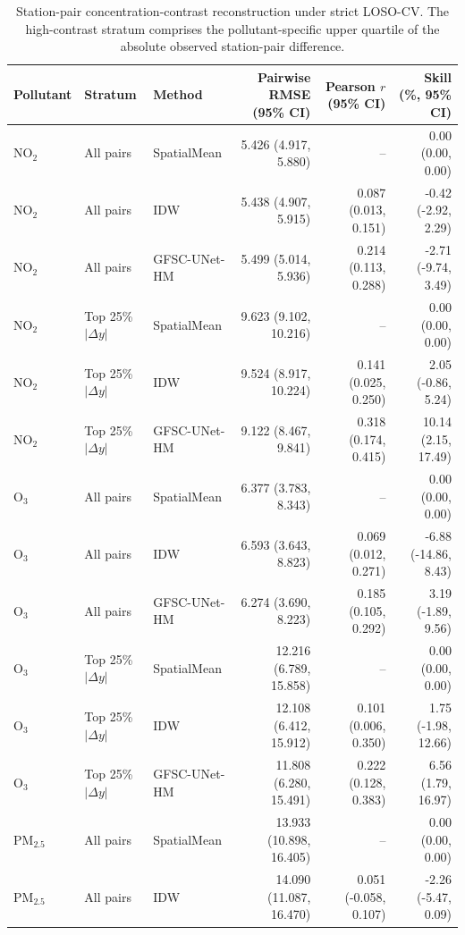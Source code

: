 \begin{table}[t]
\centering
\caption{Station-pair concentration-contrast reconstruction under strict LOSO-CV. The high-contrast stratum comprises the pollutant-specific upper quartile of the absolute observed station-pair difference.}
\label{tab:pairwise_contrast}
\scriptsize
\setlength{\tabcolsep}{3.5pt}
\begin{tabular}{lllrrr}
\toprule
Pollutant & Stratum & Method & Pairwise RMSE (95\% CI) & Pearson $r$ (95\% CI) & Skill (\%, 95\% CI) \\
\midrule
$\mathrm{NO}_2$ & All pairs & SpatialMean & 5.426 (4.917, 5.880) & -- & 0.00 (0.00, 0.00) \\
$\mathrm{NO}_2$ & All pairs & IDW & 5.438 (4.907, 5.915) & 0.087 (0.013, 0.151) & -0.42 (-2.92, 2.29) \\
$\mathrm{NO}_2$ & All pairs & GFSC-UNet-HM & 5.499 (5.014, 5.936) & 0.214 (0.113, 0.288) & -2.71 (-9.74, 3.49) \\
\addlinespace
$\mathrm{NO}_2$ & Top 25\% $|\Delta y|$ & SpatialMean & 9.623 (9.102, 10.216) & -- & 0.00 (0.00, 0.00) \\
$\mathrm{NO}_2$ & Top 25\% $|\Delta y|$ & IDW & 9.524 (8.917, 10.224) & 0.141 (0.025, 0.250) & 2.05 (-0.86, 5.24) \\
$\mathrm{NO}_2$ & Top 25\% $|\Delta y|$ & GFSC-UNet-HM & 9.122 (8.467, 9.841) & 0.318 (0.174, 0.415) & 10.14 (2.15, 17.49) \\
\addlinespace
\midrule
$\mathrm{O}_3$ & All pairs & SpatialMean & 6.377 (3.783, 8.343) & -- & 0.00 (0.00, 0.00) \\
$\mathrm{O}_3$ & All pairs & IDW & 6.593 (3.643, 8.823) & 0.069 (0.012, 0.271) & -6.88 (-14.86, 8.43) \\
$\mathrm{O}_3$ & All pairs & GFSC-UNet-HM & 6.274 (3.690, 8.223) & 0.185 (0.105, 0.292) & 3.19 (-1.89, 9.56) \\
\addlinespace
$\mathrm{O}_3$ & Top 25\% $|\Delta y|$ & SpatialMean & 12.216 (6.789, 15.858) & -- & 0.00 (0.00, 0.00) \\
$\mathrm{O}_3$ & Top 25\% $|\Delta y|$ & IDW & 12.108 (6.412, 15.912) & 0.101 (0.006, 0.350) & 1.75 (-1.98, 12.66) \\
$\mathrm{O}_3$ & Top 25\% $|\Delta y|$ & GFSC-UNet-HM & 11.808 (6.280, 15.491) & 0.222 (0.128, 0.383) & 6.56 (1.79, 16.97) \\
\addlinespace
\midrule
$\mathrm{PM}_{2.5}$ & All pairs & SpatialMean & 13.933 (10.898, 16.405) & -- & 0.00 (0.00, 0.00) \\
$\mathrm{PM}_{2.5}$ & All pairs & IDW & 14.090 (11.087, 16.470) & 0.051 (-0.058, 0.107) & -2.26 (-5.47, 0.09) \\

\end{tabular}
\end{table}
